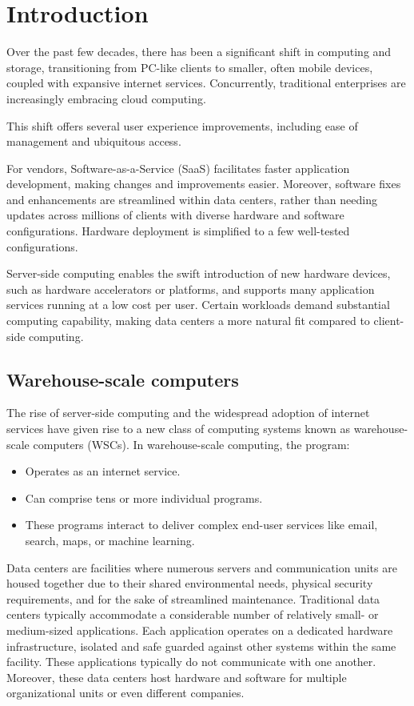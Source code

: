 \section{Introduction}

Over the past few decades, there has been a significant shift in computing and storage, transitioning from PC-like clients to smaller, often mobile devices, coupled with expansive internet services. 
Concurrently, traditional enterprises are increasingly embracing cloud computing.

This shift offers several user experience improvements, including ease of management and ubiquitous access.

For vendors, Software-as-a-Service (SaaS) facilitates faster application development, making changes and improvements easier. 
Moreover, software fixes and enhancements are streamlined within data centers, rather than needing updates across millions of clients with diverse hardware and software configurations. 
Hardware deployment is simplified to a few well-tested configurations.

Server-side computing enables the swift introduction of new hardware devices, such as hardware accelerators or platforms, and supports many application services running at a low cost per user.
Certain workloads demand substantial computing capability, making data centers a more natural fit compared to client-side computing.

\subsection{Warehouse-scale computers}
The rise of server-side computing and the widespread adoption of internet services have given rise to a new class of computing systems known as warehouse-scale computers (WSCs).
In warehouse-scale computing, the program:
\begin{itemize}
    \item Operates as an internet service.
    \item Can comprise tens or more individual programs.
    \item These programs interact to deliver complex end-user services like email, search, maps, or machine learning.
\end{itemize}
Data centers are facilities where numerous servers and communication units are housed together due to their shared environmental needs, physical security requirements, and for the sake of streamlined maintenance.
Traditional data centers typically accommodate a considerable number of relatively small- or medium-sized applications. 
Each application operates on a dedicated hardware infrastructure, isolated and safe guarded against other systems within the same facility. 
These applications typically do not communicate with one another. 
Moreover, these data centers host hardware and software for multiple organizational units or even different companies.

